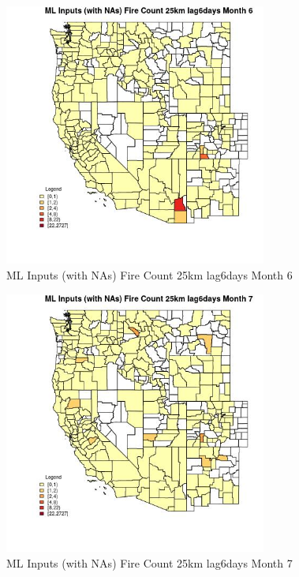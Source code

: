 \begin{figure} 
\centering  
\includegraphics[width=0.77\textwidth]{Code_Outputs/Report_ML_input_PM25_Step4_part_f_de_duplicated_aveswNAs_CountyFire_Count_25km_lag6daysmedianMonth6.jpg} 
\caption{\label{fig:Report_ML_input_PM25_Step4_part_f_de_duplicated_aveswNAsCountyFire_Count_25km_lag6daysmedianMonth6}ML Inputs (with NAs) Fire Count 25km lag6days Month 6} 
\end{figure} 
 

\begin{figure} 
\centering  
\includegraphics[width=0.77\textwidth]{Code_Outputs/Report_ML_input_PM25_Step4_part_f_de_duplicated_aveswNAs_CountyFire_Count_25km_lag6daysmedianMonth7.jpg} 
\caption{\label{fig:Report_ML_input_PM25_Step4_part_f_de_duplicated_aveswNAsCountyFire_Count_25km_lag6daysmedianMonth7}ML Inputs (with NAs) Fire Count 25km lag6days Month 7} 
\end{figure} 
 

